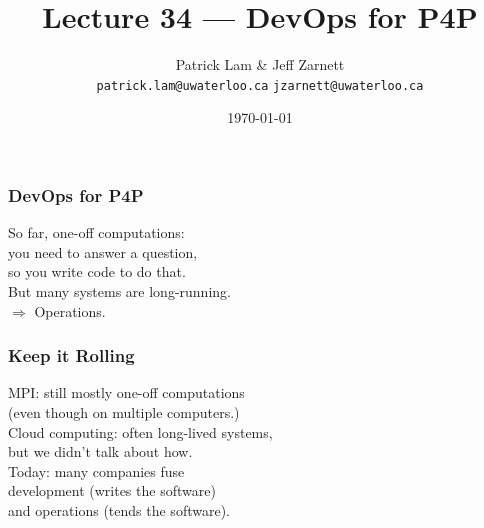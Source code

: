 

\title{Lecture 34 --- DevOps for P4P }

\author{Patrick Lam \& Jeff Zarnett \\ \small \texttt{patrick.lam@uwaterloo.ca} \texttt{jzarnett@uwaterloo.ca}}
\date{\today}




\begin{frame}
  \titlepage

 \end{frame}



\begin{frame}
\frametitle{DevOps for P4P}

\Large
\begin{changemargin}{2cm}
So far, one-off computations:\\
you need to answer a question, \\
so you write code to
do that.\\[1em]
But many systems are long-running.\\[1em]
$\Rightarrow$ Operations.
\end{changemargin}

\end{frame}



\begin{frame}
\frametitle{Keep it Rolling}

\Large
\begin{changemargin}{1cm}
MPI: still mostly one-off computations\\
(even though on multiple computers.)\\[1em]
Cloud computing: often long-lived systems,\\
but we didn't talk about how.\\[1em]
Today: many companies fuse\\
development (writes the software) \\
and operations (tends the software).
\end{changemargin}
\end{frame}




